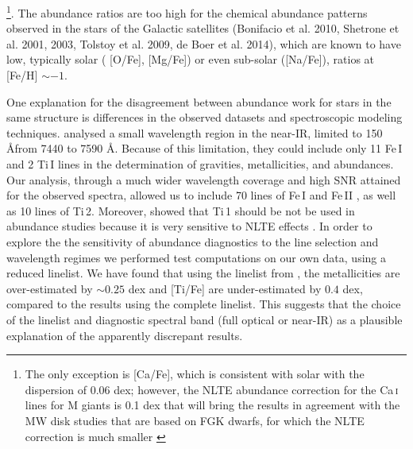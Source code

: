 \documentclass[galaxies,article,submit,moreauthors,pdftex,10pt,a4paper]{mdpi}
\newcommand{\ion}[2]{#1\,\textsc{#2}}
\begin{document}
\footnote{The only exception is [Ca/Fe], which is consistent with solar with the dispersion of 0.06 dex; however, the NLTE abundance correction for the \ion{Ca}{i} lines for M giants is 0.1 dex that will bring the results in agreement with the MW disk studies that are based on FGK dwarfs, for which the NLTE correction is much smaller \cite{Merle2011}}.
The abundance ratios are too high for the chemical abundance patterns observed in the stars of the Galactic satellites (Bonifacio et al. 2010, Shetrone et al. 2001, 2003, Tolstoy et al. 2009, de Boer et al. 2014), which are known to have low, typically solar ( [O/Fe], [Mg/Fe]) or even sub-solar ([Na/Fe]), ratios at [Fe/H] $\sim -1$.


One explanation for the disagreement between abundance work for stars in the same structure is
differences in the observed datasets and spectroscopic modeling techniques.
\cite{chou2010b} analysed a small wavelength region in the near-IR, limited to 150 \AA from 7440 to 7590 \AA. Because of this limitation, they could include only 11 \ion{Fe}{I} and 2 \ion{Ti}{I} lines in the determination of gravities, metallicities, and abundances. Our analysis, through a much wider wavelength coverage and high SNR attained for the observed spectra, allowed us to include 70 lines of \ion{Fe}{I} and \ion{Fe}{II} \cite{bergemann2012}, as well as 10 lines of \ion{Ti}{2}. Moreover,  \cite{bergemann2011} showed that \ion{Ti}{1} should be not be used in abundance studies because it is very sensitive to NLTE effects .
In order to explore the the sensitivity of abundance diagnostics to the line selection and wavelength regimes we performed test computations on our own data, using a reduced linelist. We have found that using the linelist from \cite{chou2010a}, the metallicities are over-estimated by $\sim 0.25$ dex and [Ti/Fe] are under-estimated by $0.4$ dex, compared to the results using the complete linelist. This suggests that the choice of the linelist and diagnostic spectral band (full optical or near-IR) as a plausible explanation  of the apparently discrepant results.
\end{document}

